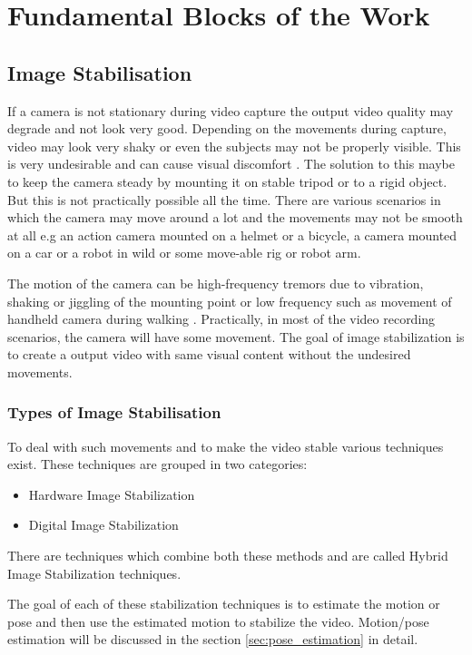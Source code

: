 \chapter{Fundamental Blocks of the Work} \label{chapter_two}


\section{Image Stabilisation}
\label{sec:image_stab}
If a camera is not stationary during video capture the output video quality may degrade and not look very good. Depending on the movements during capture, video may look very shaky or even the subjects may not be properly visible. This is very undesirable and can cause visual discomfort \citep{jia2012probabilistic}. The solution to this maybe to keep the camera steady by mounting it on stable tripod or to a rigid object. But this is not practically possible all the time. There are various scenarios in which the camera may move around a lot and the movements may not be smooth at all e.g an action camera mounted on a helmet or a bicycle, a camera mounted on a car or a robot in wild or some move-able rig or robot arm.

The motion of the camera can be high-frequency tremors due to vibration, shaking or jiggling of the mounting point \citep{ryu2012robust} or low frequency such as movement of handheld camera during walking \citep{dis_review}. Practically, in most of the video recording scenarios, the camera will have some movement. The goal of image stabilization is to create a output video with same visual content without the undesired movements. 

\subsection{Types of Image Stabilisation}
To deal with such movements and to make the video stable various techniques exist. These techniques are grouped in two categories:

\begin{itemize}
\item Hardware Image Stabilization
\item Digital Image Stabilization  
\end{itemize}
There are techniques which combine both these methods and are called Hybrid Image Stabilization techniques.

The goal of each of these stabilization techniques is to estimate the motion or pose and then use the estimated motion to stabilize the video. Motion/pose estimation will be discussed in the section \ref{sec:pose_estimation} in detail.

